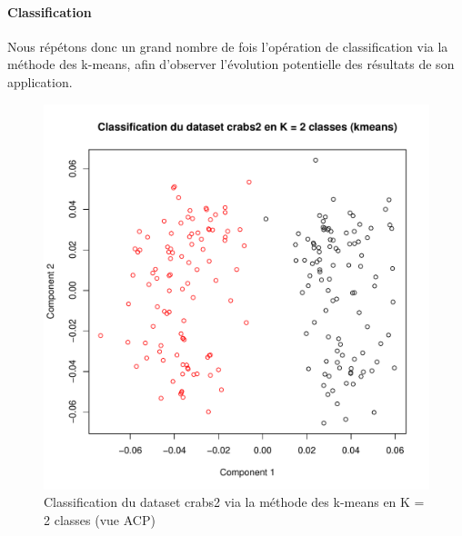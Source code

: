 \documentclass{report}
\begin{document}
\paragraph{Classification}
Nous répétons donc un grand nombre de fois l'opération de classification via la méthode des k-means, afin d'observer l'évolution potentielle des résultats de son application.
\begin{figure}[ht!]
\begin{center}
    \includegraphics[width=\textwidth]{../plots/E3Q5_1.pdf}
    \caption{Classification du dataset crabs2 via la méthode des k-means en K = 2 classes (vue ACP)}
\end{center}
\end{figure}
\newpage
\end{document}
